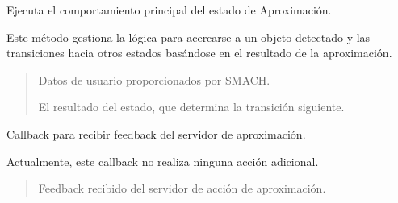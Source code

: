 \documentclass[a4paper,10pt,spanish]{sphinxmanual}
\begin{document}
\begin{fulllineitems}
\begin{fulllineitems}
\begin{quote}
\begin{description}
\end{description}\end{quote}

\end{fulllineitems}


\begin{fulllineitems}
\label{\detokenize{squad_state_manager:squad_state_manager.EstadoApproach.execute}}
\pysigstartsignatures
{}
\pysigstopsignatures
\sphinxAtStartPar
Ejecuta el comportamiento principal del estado de Aproximación.

\sphinxAtStartPar
Este método gestiona la lógica para acercarse a un objeto detectado y las transiciones
hacia otros estados basándose en el resultado de la aproximación.
\begin{quote}\begin{description}
\sphinxAtStartPar
{} \textendash{} Datos de usuario proporcionados por SMACH.

\sphinxAtStartPar
El resultado del estado, que determina la transición siguiente.

\sphinxAtStartPar
{}

\end{description}\end{quote}

\end{fulllineitems}


\begin{fulllineitems}
\label{\detokenize{squad_state_manager:squad_state_manager.EstadoApproach.feedback_cb}}
\pysigstartsignatures
{}
\pysigstopsignatures
\sphinxAtStartPar
Callback para recibir feedback del servidor de aproximación.

\sphinxAtStartPar
Actualmente, este callback no realiza ninguna acción adicional.
\begin{quote}\begin{description}
\sphinxAtStartPar
{} \textendash{} Feedback recibido del servidor de acción de aproximación.

\end{description}\end{quote}

\end{fulllineitems}


\end{fulllineitems}
\end{document}
